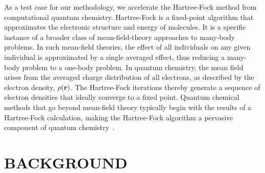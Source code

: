 \documentclass[twoside,11pt]{article}
\begin{document}
As a test case for our methodology, we accelerate the Hartree-Fock method from computational quantum chemistry. Hartree-Fock is a fixed-point algorithm that approximates the electronic structure and energy of molecules.  It is a specific instance of a broader class of mean-field-theory approaches to many-body problems. In such mean-field theories, the effect of all individuals on any given individual is approximated by a single averaged effect, thus reducing a many-body problem to a one-body problem. In quantum chemistry, the mean field arises from the averaged charge distribution of all electrons, as described by the electron density, $\rho({\bf r})$. The Hartree-Fock iterations thereby generate a sequence of electron densities that ideally converge to a fixed point. Quantum chemical methods that go beyond mean-field theory typically begin with the results of a Hartree-Fock calculation, making the Hartree-Fock algorithm a pervasive component of quantum chemistry~\citep{cook}.


\section{BACKGROUND}
\end{document}
